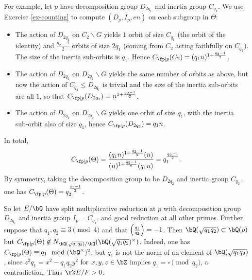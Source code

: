 \begin{example}[Dihedral]
    For example, let $p$ have decomposition group $D_{2 q_1}$ and inertia group $C_{q_1}$. We use Exercise \ref{ex-counting} to compute $(D_p, I_p, en)$ on each subgroup in $\Theta$:
        \begin{itemize}[--]
            \setlength\itemsep{0em}
            \item The action of $D_{2 q_1}$ on $C_2 \backslash G$ yields $1$ orbit of size $C_{q_1}$ (the orbit of the identity) and $\frac{q_2 - 1}{2}$ orbits of size $2q_1$ (coming from $C_2$ acting faithfully on $C_{q_2}$). The size of the inertia sub-orbits is $q_1$. Hence $C_{\fp \mid p}(C_2) = (q_1 n)^{1 + \frac{q_2 - 1}{2}}$.
            \item The action of $D_{2 q_1}$ on $D_{2 q_1} \backslash G$ yields the same number of orbits as above, but now the action of $C_{q_1} \leq D_{2 q_1}$ is trivial and the size of the inertia sub-orbits are all $1$, so that $C_{\fp \mid p}(D_{2 q_1}) = n^{1 + \frac{q_2 - 1}{2}}$.
            \item The action of $D_{2 q_1}$ on $D_{2 q_2} \backslash G$ yields one orbit of size $q_1$, with the inertia sub-orbit also of size $q_1$, hence $C_{\fp \mid p}(D_{2 q_2}) = q_1 n$.
        \end{itemize}
    In total,
    \[ C_{\fp \mid p}(\Theta) = \frac{(q_1 n )^{1 + \frac{q_2 - 1}{2}} (n)}{(n)^{1 + \frac{q_2 - 1}{2}} (q_1 n)} = q_1^{\frac{q_2 - 1}{2}} .\] 
    By symmetry, taking the decomposition group to be $D_{2 q_2}$ and inertia group $C_{q_2}$, one has 
     $C_{\fp \mid p}(\Theta) = q_2^{\frac{q_1 - 1}{2}}$.

    So let $E / \bQ$ have split multiplicative reduction at $p$ with decomposition group $D_{2 q_1}$ and inertia group $I_p = C_{q_1}$, and good reduction at all other primes. Further suppose that $q_1, q_2 \equiv 3 \pmod 4$ and that $\left( \frac{q_1}{q_2} \right)  = -1$. Then $\bQ(\sqrt{q_1 q_2}) \subset \bQ(\rho)$ but $C_{\fp \mid p}(\Theta) \not\in N_{\bQ(\sqrt{q_1 q_2}) / \bQ}(\bQ(\sqrt{q_1 q_2})^{\times})$. Indeed, one has $C_{\fp \mid p}(\Theta) \equiv q_1 \mod (\bQ^{\times})^2$, but $q_1$ is not the norm of an element of $\bQ(\sqrt{q_1 q_2})$, since $z^2 q_1 = x^2 - q_1q_2 y^2$ for $x,y,z \in \bZ$ implies $q_1 = \square \pmod {q_2}$, a contradiction. Thus $\rk E / F > 0$.


\end{example}
